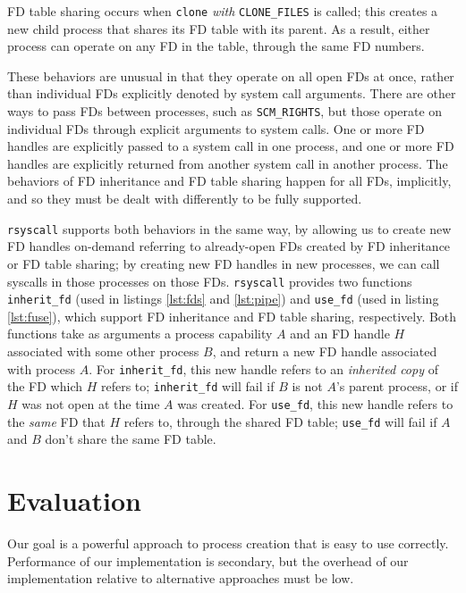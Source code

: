 \documentclass[letterpaper,twocolumn,10pt]{article}
\begin{document}
FD table sharing occurs when \texttt{clone} \textit{with} \texttt{CLONE\_FILES} is called;
this creates a new child process that shares its FD table with its parent.
As a result, either process can operate on any FD in the table,
through the same FD numbers.

These behaviors are unusual in that they operate on all open FDs at once,
rather than individual FDs explicitly denoted by system call arguments.
There are other ways to pass FDs between processes,
such as \texttt{SCM\_RIGHTS}\cite{scm_rights},
but those operate on individual FDs through explicit arguments to system calls.
One or more FD handles are explicitly passed to a system call in one process,
and one or more FD handles are explicitly returned from another system call in another process.
The behaviors of FD inheritance and FD table sharing happen for all FDs, implicitly,
and so they must be dealt with differently to be fully supported.

\texttt{rsyscall} supports both behaviors in the same way,
by allowing us to create new FD handles on-demand
referring to already-open FDs created by FD inheritance or FD table sharing;
by creating new FD handles in new processes, we can call syscalls in those processes on those FDs.
\texttt{rsyscall} provides two functions
\texttt{inherit\_fd} (used in listings \ref{lst:fds} and \ref{lst:pipe})
and \texttt{use\_fd} (used in listing \ref{lst:fuse}), which support FD inheritance and FD table sharing, respectively.
Both functions take as arguments a process capability $A$ and an FD handle $H$ associated with some other process $B$,
and return a new FD handle associated with process $A$.
For \texttt{inherit\_fd},
this new handle refers to an \textit{inherited copy} of the FD which $H$ refers to;
\texttt{inherit\_fd} will fail if $B$ is not $A$'s parent process,
or if $H$ was not open at the time $A$ was created.
For \texttt{use\_fd},
this new handle refers to the \textit{same} FD that $H$ refers to, through the shared FD table;
\texttt{use\_fd} will fail if $A$ and $B$ don't share the same FD table.
\section{Evaluation}\label{evaluation}
Our goal is a powerful approach to process creation that is easy to use correctly.
Performance of our implementation is secondary,
but the overhead of our implementation relative to alternative approaches
must be low.
\end{document}
